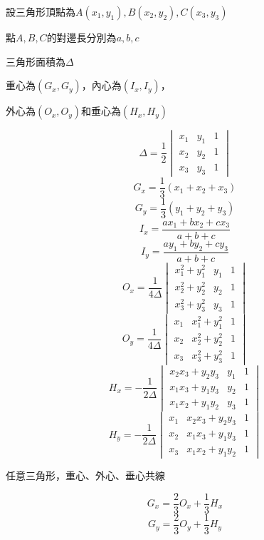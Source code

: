 設三角形頂點為$A(x_1, y_1), B(x_2, y_2), C(x_3, y_3)$ \par
點$A, B, C$的對邊長分別為$a, b, c$ \par
三角形面積為$\Delta$ \par
重心為$(G_x, G_y)$，內心為$(I_x, I_y)$， \par
外心為$(O_x, O_y)$和垂心為$(H_x, H_y)$ \par
\[
    \Delta = \frac{1}{2}
    \begin{vmatrix}
        x_1 & y_1 & 1\\
        x_2 & y_2 & 1\\
        x_3 & y_3 & 1
    \end{vmatrix}
\]
\[
    G_x = \frac{1}{3}\left(x_1+x_2+x_3\right)
\]
\[
    G_y = \frac{1}{3}\left(y_1+y_2+y_3\right)
\]
\[
    I_x = \frac{ax_1+bx_2+cx_3}{a+b+c}
\]
\[
    I_y = \frac{ay_1+by_2+cy_3}{a+b+c}
\]
\[
    O_x = \frac{1}{4\Delta}
        \begin{vmatrix}
            x_1^2+y_1^2 & y_1 & 1\\
            x_2^2+y_2^2 & y_2 & 1\\
            x_3^2+y_3^2 & y_3 & 1
        \end{vmatrix}
\]
\[
    O_y = \frac{1}{4\Delta}
        \begin{vmatrix}
            x_1 & x_1^2+y_1^2 & 1\\
            x_2 & x_2^2+y_2^2 & 1\\
            x_3 & x_3^2+y_3^2 & 1
        \end{vmatrix}
\]
\[
    H_x = -\frac{1}{2\Delta}
        \begin{vmatrix}
            x_2x_3+y_2y_3 & y_1 & 1\\
            x_1x_3+y_1y_3 & y_2 & 1\\
            x_1x_2+y_1y_2 & y_3 & 1
        \end{vmatrix}
\]
\[
    H_y = -\frac{1}{2\Delta}
        \begin{vmatrix}
            x_1 & x_2x_3+y_2y_3 & 1\\
            x_2 & x_1x_3+y_1y_3 & 1\\
            x_3 & x_1x_2+y_1y_2 & 1
        \end{vmatrix}
\]

任意三角形，重心、外心、垂心共線 \par
\[
      G_x = \frac{2}{3}O_x+\frac{1}{3}H_x
\]
\[
      G_y = \frac{2}{3}O_y+\frac{1}{3}H_y
\]